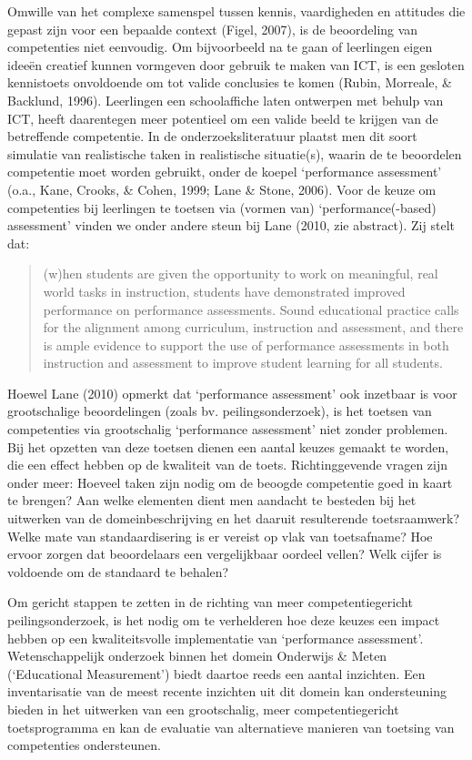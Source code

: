 \documentclass[
  letterpaper,
]{report}
\begin{document}
Omwille van het complexe samenspel tussen kennis, vaardigheden en
attitudes die gepast zijn voor een bepaalde context (Figel, 2007), is de
beoordeling van competenties niet eenvoudig. Om bijvoorbeeld na te gaan
of leerlingen eigen ideeën creatief kunnen vormgeven door gebruik te
maken van ICT, is een gesloten kennistoets onvoldoende om tot valide
conclusies te komen (Rubin, Morreale, \& Backlund, 1996). Leerlingen een
schoolaffiche laten ontwerpen met behulp van ICT, heeft daarentegen meer
potentieel om een valide beeld te krijgen van de betreffende
competentie. In de onderzoeksliteratuur plaatst men dit soort simulatie
van realistische taken in realistische situatie(s), waarin de te
beoordelen competentie moet worden gebruikt, onder de koepel
`performance assessment' (o.a., Kane, Crooks, \& Cohen, 1999; Lane \&
Stone, 2006). Voor de keuze om competenties bij leerlingen te toetsen
via (vormen van) `performance(-based) assessment' vinden we onder andere
steun bij Lane (2010, zie abstract). Zij stelt dat:

\begin{quote}
(w)hen students are given the opportunity to work on meaningful, real
world tasks in instruction, students have demonstrated improved
performance on performance assessments. Sound educational practice calls
for the alignment among curriculum, instruction and assessment, and
there is ample evidence to support the use of performance assessments in
both instruction and assessment to improve student learning for all
students.
\end{quote}

Hoewel Lane (2010) opmerkt dat `performance assessment' ook inzetbaar is
voor grootschalige beoordelingen (zoals bv. peilingsonderzoek), is het
toetsen van competenties via grootschalig `performance assessment' niet
zonder problemen. Bij het opzetten van deze toetsen dienen een aantal
keuzes gemaakt te worden, die een effect hebben op de kwaliteit van de
toets. Richtinggevende vragen zijn onder meer: Hoeveel taken zijn nodig
om de beoogde competentie goed in kaart te brengen? Aan welke elementen
dient men aandacht te besteden bij het uitwerken van de
domeinbeschrijving en het daaruit resulterende toetsraamwerk? Welke mate
van standaardisering is er vereist op vlak van toetsafname? Hoe ervoor
zorgen dat beoordelaars een vergelijkbaar oordeel vellen? Welk cijfer is
voldoende om de standaard te behalen?

Om gericht stappen te zetten in de richting van meer competentiegericht
peilingsonderzoek, is het nodig om te verhelderen hoe deze keuzes een
impact hebben op een kwaliteitsvolle implementatie van `performance
assessment'. Wetenschappelijk onderzoek binnen het domein Onderwijs \&
Meten (`Educational Measurement') biedt daartoe reeds een aantal
inzichten. Een inventarisatie van de meest recente inzichten uit dit
domein kan ondersteuning bieden in het uitwerken van een grootschalig,
meer competentiegericht toetsprogramma en kan de evaluatie van
alternatieve manieren van toetsing van competenties ondersteunen.
\end{document}
